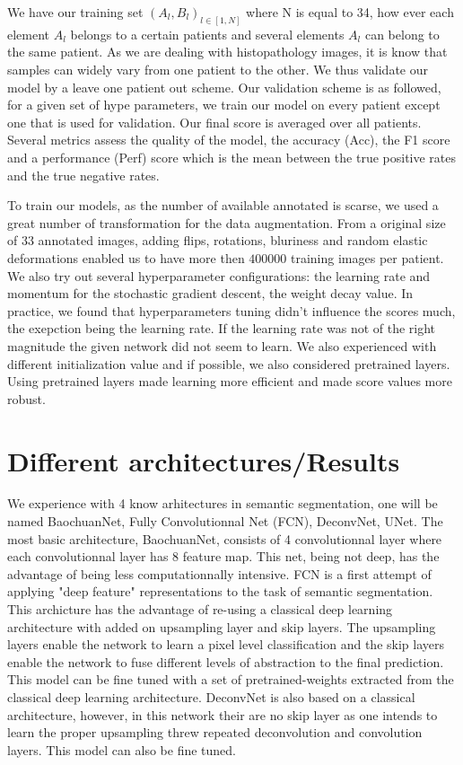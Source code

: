\documentclass{article}
\begin{document}
We have our training set $(A_l,B_l)_{l \in [1, N]}$ where N is equal to 
34, how ever each element $A_l$ belongs to a certain patients and 
several elements $A_l$ can belong to the same patient. As we are 
dealing with histopathology images, it is know that samples can widely 
vary from one patient to the other. We thus validate our model by a 
leave one patient out scheme. Our validation scheme is as followed, for a 
given set of hype parameters, we 
train our model on every patient except one that is used for validation. 
Our final score is averaged over all patients.
Several metrics assess the quality of the model, the accuracy (Acc), the 
F1 score and a performance (Perf) score which is the mean between the 
true positive rates and the true negative rates.

To train our models, as the number of available annotated is scarse, we 
used a great number of transformation for the data augmentation. From 
a original size of 33 annotated images, adding flips, rotations, bluriness 
and random elastic deformations enabled us to have more then 
$400 000$ training images per patient. 
We also try out several hyperparameter configurations: the learning rate and 
momentum for the stochastic gradient descent, the weight decay value.  
In practice, we found that hyperparameters tuning didn't influence the 
scores much, the exepction being the learning rate. If the learning rate 
was not of the right magnitude the given network did not seem to learn. 
We also experienced with different 
initialization value and if possible, we also considered pretrained layers. 
Using pretrained layers made learning more efficient and made score 
values more robust.

\section{Different architectures/Results}
\label{sec:method}
We experience with 4 know arhitectures in semantic segmentation, one 
will be named BaochuanNet, Fully Convolutionnal Net (FCN), DeconvNet, 
UNet. The most basic architecture, BaochuanNet, consists of 4 
convolutionnal layer where each convolutionnal layer has 8 feature map. 
This net, being not deep, has the advantage of being less 
computationnally intensive. FCN is a first attempt of applying "deep 
feature" representations to the task of semantic segmentation. This 
archicture has the advantage of re-using a classical deep learning 
architecture with added on upsampling layer and skip layers. The 
upsampling layers enable the network to learn a pixel level classification 
and the skip layers enable the network to fuse different levels of 
abstraction to the final prediction. This model can be fine tuned with a 
set of pretrained-weights extracted from the classical deep learning 
architecture. DeconvNet is also based on a classical architecture, 
however, in this network their are no skip layer as one intends to learn 
the proper upsampling threw repeated deconvolution and convolution 
layers. This model can also be fine tuned.
\end{document}
